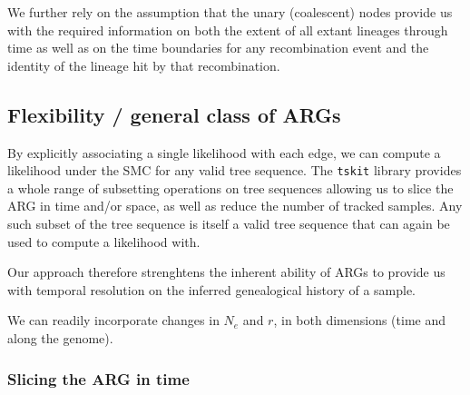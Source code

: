 \documentclass{article}
\begin{document}
We further rely on the assumption that the unary (coalescent) nodes 
provide us with the required information on both the extent of all extant lineages through 
time as well as on the time boundaries for any recombination event and the identity of the 
lineage hit by that recombination.






\subsection{Flexibility / general class of ARGs}



By explicitly associating a single likelihood with each edge, we can compute a likelihood 
under the SMC for any valid tree sequence. The \texttt{tskit} library provides a whole range  
of subsetting operations on tree sequences allowing us to slice the ARG in time and/or space, 
as well as reduce the number of tracked samples. 
Any such subset of the tree sequence is itself a valid tree sequence 
that can again be used to compute a likelihood with.

Our approach therefore strenghtens the inherent ability of ARGs to provide us with temporal 
resolution on the inferred genealogical history of a sample.


We can readily incorporate changes in $N_e$ and $r$, in both dimensions (time and along the genome).

\subsubsection{Slicing the ARG in time}
\end{document}
